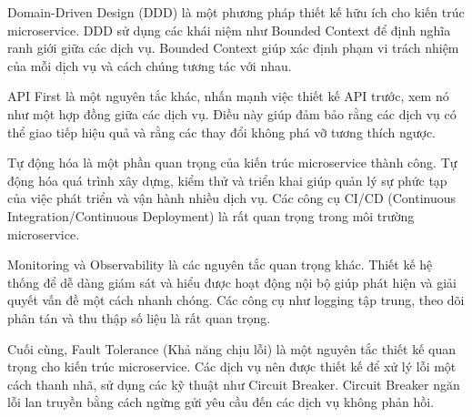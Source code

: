 Domain-Driven Design (DDD) là một phương pháp thiết kế hữu ích cho kiến trúc
microservice. DDD sử dụng các khái niệm như Bounded Context để định nghĩa ranh
giới giữa các dịch vụ. Bounded Context giúp xác định phạm vi trách nhiệm của
mỗi dịch vụ và cách chúng tương tác với nhau.

API First là một nguyên tắc khác, nhấn mạnh việc thiết kế API trước, xem nó như
một hợp đồng giữa các dịch vụ. Điều này giúp đảm bảo rằng các dịch vụ có thể
giao tiếp hiệu quả và rằng các thay đổi không phá vỡ tương thích ngược.

Tự động hóa là một phần quan trọng của kiến trúc microservice thành công. Tự
động hóa quá trình xây dựng, kiểm thử và triển khai giúp quản lý sự phức tạp
của việc phát triển và vận hành nhiều dịch vụ. Các công cụ CI/CD (Continuous
Integration/Continuous Deployment) là rất quan trọng trong môi trường
microservice.

Monitoring và Observability là các nguyên tắc quan trọng khác. Thiết kế hệ
thống để dễ dàng giám sát và hiểu được hoạt động nội bộ giúp phát hiện và giải
quyết vấn đề một cách nhanh chóng. Các công cụ như logging tập trung, theo dõi
phân tán và thu thập số liệu là rất quan trọng.

Cuối cùng, Fault Tolerance (Khả năng chịu lỗi) là một nguyên tắc thiết kế quan
trọng cho kiến trúc microservice. Các dịch vụ nên được thiết kế để xử lý lỗi
một cách thanh nhã, sử dụng các kỹ thuật như Circuit Breaker. Circuit Breaker
ngăn lỗi lan truyền bằng cách ngừng gửi yêu cầu đến các dịch vụ không phản hồi.